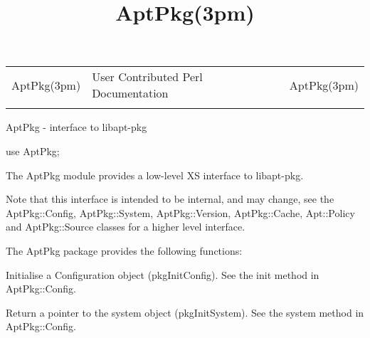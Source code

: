 \documentclass[]{article}
\title{AptPkg(3pm)}
\author{}
\date{}
\renewcommand{\emph}[1]{\underline{#1}}
\begin{document}
\maketitle

\begin{longtable}[c]{@{}lll@{}}
\toprule\addlinespace
AptPkg(3pm) & User Contributed Perl Documentation & AptPkg(3pm)
\\\addlinespace
\bottomrule
\end{longtable}


AptPkg - interface to libapt-pkg


use AptPkg;


The AptPkg module provides a low-level XS interface to libapt-pkg.

Note that this interface is intended to be internal, and may change, see
the AptPkg::Config, AptPkg::System, AptPkg::Version, AptPkg::Cache,
Apt::Policy and AptPkg::Source classes for a higher level interface.


The AptPkg package provides the following functions:

\begin{description}
\itemsep1pt\parskip0pt
\item[\_init\_config(\emph{CONF})]
Initialise a Configuration object (pkgInitConfig). See the init method
in AptPkg::Config.
\end{description}

\begin{description}
\itemsep1pt\parskip0pt
\item[\_init\_system(\emph{CONF})]
Return a pointer to the system object (pkgInitSystem). See the system
method in AptPkg::Config.
\end{description}
\end{document}
